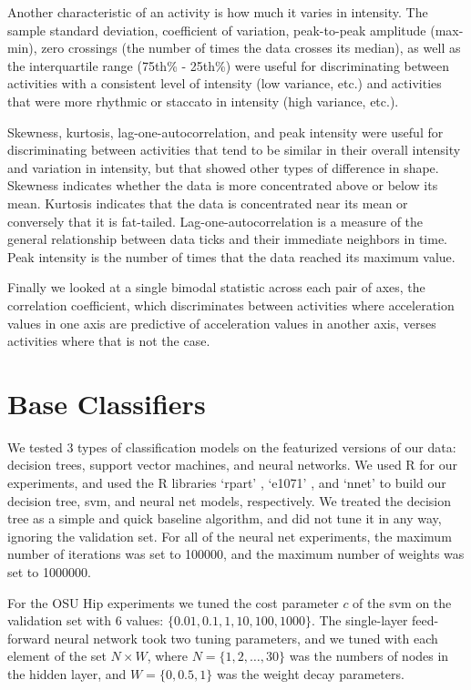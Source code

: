 Another characteristic of an activity is how much it varies in intensity. The sample standard
deviation, coefficient of variation, peak-to-peak amplitude (max-min), zero crossings
(the number of times the data crosses its median), as well as the
interquartile range (75th\% - 25th\%) were useful for discriminating between activities
with a consistent level of intensity (low variance, etc.) and activities that were more
rhythmic or staccato in intensity (high variance, etc.). 

Skewness, kurtosis, lag-one-autocorrelation, and peak intensity
were useful for discriminating between
activities that tend to be similar in their overall intensity and variation in intensity,
but that showed other types of difference in shape. Skewness indicates whether the data is
more concentrated above or below its mean. Kurtosis indicates that the data is concentrated
near its mean or conversely that it is fat-tailed. Lag-one-autocorrelation is a measure of
the general relationship between data ticks and their immediate neighbors in time. Peak
intensity is the number of times that the data reached its maximum value. 

Finally we looked at a single bimodal statistic across each pair of axes, the correlation
coefficient, which discriminates between activities where acceleration values in one axis
are predictive of acceleration values in another axis, verses activities where that is not the case.

\section{Base Classifiers}

We tested 3 types of classification models on the featurized versions of our data:
decision trees, support vector machines, and neural networks. We used R for our
experiments, and used the R libraries `rpart' \cite{rpart}, `e1071' \cite{svm},
and `nnet' \cite{nnet} to build
our decision tree, svm, and neural net models, respectively. We treated the
decision tree as a simple and quick baseline algorithm, and did not tune it in
any way, ignoring the validation set. For all of the neural net experiments,
the maximum number of iterations was set to 100000, and the maximum number of
weights was set to 1000000.

For the OSU Hip experiments we tuned the
cost parameter $c$ of the svm on the validation set with 6 values:
$\{0.01,0.1,1,10,100,1000\}$. The single-layer feed-forward neural network took
two tuning parameters, and we tuned with each element of the set $N \times W$,
where $N = \{1,2, \ldots, 30\}$ was the numbers of nodes in the hidden layer, and 
$W = \{0,0.5,1\}$ was the weight decay parameters.

